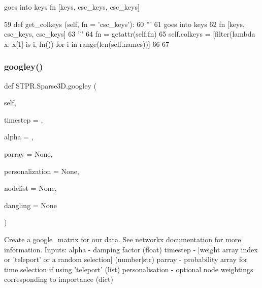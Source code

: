 \begin{DoxyVerb}goes into keys
fn [keys, csc_keys, csc_keys]
\end{DoxyVerb}
 
\begin{DoxyCode}
59       \textcolor{keyword}{def }get\_colkeys (self, fn = 'csc\_keys'):
60           \textcolor{stringliteral}{'''}
61 \textcolor{stringliteral}{          goes into keys}
62 \textcolor{stringliteral}{          fn [keys, csc\_keys, csc\_keys]}
63 \textcolor{stringliteral}{          '''}
64           fn = getattr(self,fn)
65           self.colkeys = [filter(\textcolor{keyword}{lambda} x: x[1] \textcolor{keywordflow}{is} i, fn()) \textcolor{keywordflow}{for} i \textcolor{keywordflow}{in} range(len(self.names))]
66       
67       
\end{DoxyCode}
\mbox{\label{classSTPR_1_1Sparse3D_add417073a46122cadb2c720840deec12}} 
\subsubsection{\texorpdfstring{googley()}{googley()}}
{\footnotesize\ttfamily def S\+T\+P\+R.\+Sparse3\+D.\+googley (\begin{DoxyParamCaption}\item[{}]{self,  }\item[{}]{timestep = {},  }\item[{}]{alpha = {},  }\item[{}]{parray = {\ttfamily None},  }\item[{}]{personalization = {\ttfamily None},  }\item[{}]{nodelist = {\ttfamily None},  }\item[{}]{dangling = {\ttfamily None} }\end{DoxyParamCaption})}

\begin{DoxyVerb}Create a google_matrix for our data. See networkx documentation for more information. 
  Inputs: 
    alpha - damping factor (float)
    timestep - [weight array index or 'teleport' or a random selection] (number|str)
    parray - probability array for time selection if using 'teleport' (list)
    personalisation - optional node weightings corresponding to importance (dict)\end{DoxyVerb}
 
